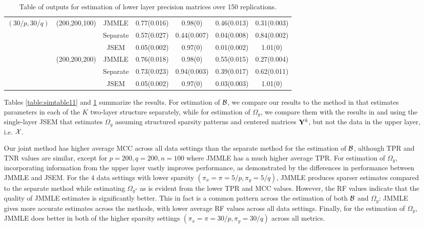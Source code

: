 \begin{scriptsize}
\begin{table}[t!]
\begin{tabular}{ccccccc}
    $(30/p, 30/q)$ & (200,200,100) & JMMLE    & 0.77(0.016) & 0.98(0)      & 0.46(0.013)  & 0.31(0.003) \\
    ~              & ~             & Separate & 0.57(0.027) & 0.44(0.007)  & 0.04(0.008)  & 0.84(0.002)\\
    ~              & ~             & JSEM     & 0.05(0.002) & 0.97(0)      & 0.01(0.002)  & 1.01(0)     \\\cline{2-7}
    ~              & (200,200,200) & JMMLE    & 0.76(0.018)  & 0.98(0)     & 0.55(0.015)  & 0.27(0.004) \\
    ~              & ~             & Separate & 0.73(0.023) & 0.94(0.003)  & 0.39(0.017)  & 0.62(0.011)\\
    ~              & ~             & JSEM     & 0.05(0.002) & 0.97(0)      & 0.03(0.003)  & 1.01(0)     \\\hline
    \end{tabular}
    \caption{Table of outputs for estimation of lower layer precision matrices over 150 replications.}
    \label{table:simtable12}
\end{table}
\end{scriptsize}

Tables \ref{table:simtable11} and \ref{table:simtable12} summarize the results. For estimation of ${\cal{B}}$, we compare our results to the method in \citet{LinEtal16} that estimates parameters in each of the $K$ two-layer structure separately, while for estimation of $\Omega_y$, we compare them with the results in \citet{LinEtal16} and using the single-layer JSEM \citep{MaMichailidis15} that estimates $\Omega_y$ assuming structured sparsity patterns and centered matrices ${\mathbf{Y}}^k$, but not the data in the upper layer, i.e. ${\cal{X}}$.

Our joint method has higher average MCC across all data settings than the separate method for the estimation of ${\cal{B}}$, although TPR and TNR values are similar, except for $p=200, q=200, n=100$ where JMMLE has a much higher average TPR. For estimation of $\Omega_y$, incorporating information from the upper layer vastly improves performance, as demonstrated by the differences in performance between JMMLE and JSEM. For the 4 data settings with lower sparsity $(\pi_x = \pi = 5/p, \pi_y = 5/q)$, JMMLE produces sparser estimates compared to the separate method while estimating $\Omega_y$- as is evident from the lower TPR and MCC values. However, the RF values indicate that the quality of JMMLE estimates is significantly better. This in fact is a common pattern across the estimation of both ${\cal{B}}$ and $\Omega_y$: JMMLE gives more accurate estimates across the methods, with lower average RF values across all data settings. Finally, for the estimation of $\Omega_y$, JMMLE does better in both of the higher sparsity settings $(\pi_x = \pi = 30/p, \pi_y = 30/q)$ across all metrics.
%

